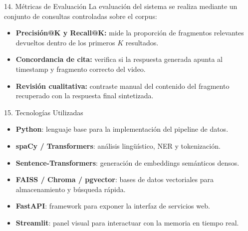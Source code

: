 \documentclass[12pt,a4paper]{article}
\begin{document}
\begin{minipage}[t]{0.485\linewidth}

  \begin{cajapln}{14. Métricas de Evaluación}
    La evaluación del sistema se realiza mediante un conjunto de consultas controladas sobre el corpus:
    \begin{itemize}
      \item \textbf{Precisión@K y Recall@K:} mide la proporción de fragmentos relevantes devueltos dentro de los primeros $K$ resultados.
      \item \textbf{Concordancia de cita:} verifica si la respuesta generada apunta al timestamp y fragmento correcto del video.
      \item \textbf{Revisión cualitativa:} contraste manual del contenido del fragmento recuperado con la respuesta final sintetizada.
    \end{itemize}
  \end{cajapln}

  \vspace{10pt}

  \begin{cajapln}{15. Tecnologías Utilizadas}
    \begin{itemize}
      \item \textbf{Python}: lenguaje base para la implementación del pipeline de datos.
      \item \textbf{spaCy / Transformers}: análisis lingüístico, NER y tokenización.
      \item \textbf{Sentence-Transformers}: generación de embeddings semánticos densos.
      \item \textbf{FAISS / Chroma / pgvector}: bases de datos vectoriales para almacenamiento y búsqueda rápida.
      \item \textbf{FastAPI}: framework para exponer la interfaz de servicios web.
      \item \textbf{Streamlit}: panel visual para interactuar con la memoria en tiempo real.
    \end{itemize}
  \end{cajapln}

\end{minipage}

\vspace{12pt}
\end{document}
